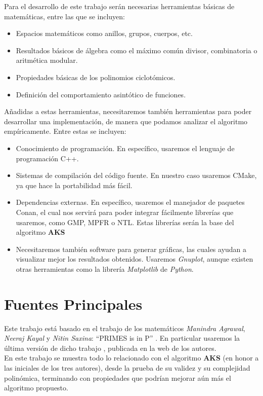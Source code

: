 Para el desarrollo de este trabajo serán necesarias herramientas básicas de matemáticas, entre las que se incluyen:

\begin{itemize}
	\item Espacios matemáticos como anillos, grupos, cuerpos, etc.
	
	\item Resultados básicos de álgebra como el máximo común divisor, combinatoria o aritmética modular.
	
	\item Propiedades básicas de los polinomios ciclotómicos.
	
	\item Definición del comportamiento asintótico de funciones.
\end{itemize}

Añadidas a estas herramientas, necesitaremos también herramientas para poder desarrollar una implementación, de manera que podamos analizar el algoritmo empíricamente. Entre estas se incluyen:

\begin{itemize}
	\item Conocimiento de programación. En específico, usaremos el lenguaje de programación C++.
	
	\item Sistemas de compilación del código fuente. En nuestro caso usaremos CMake, ya que hace la portabilidad más fácil.
	
	\item Dependencias externas. En específico, usaremos el manejador de paquetes Conan, el cual nos servirá para poder integrar fácilmente librerías que usaremos, como GMP, MPFR o NTL. Estas librerías serán la base del algoritmo \textbf{AKS}
	
	\item Necesitaremos también software para generar gráficas, las cuales ayudan a visualizar mejor los resultados obtenidos. Usaremos \textit{Gnuplot}, aunque existen otras herramientas como la librería \textit{Matplotlib} de \textit{Python}.
\end{itemize}

\section{Fuentes Principales}

Este trabajo está basado en el trabajo de los matemáticos \textit{Manindra Agrawal}, \textit{Neeraj Kayal} y \textit{Nitin Saxina}: ``PRIMES is in P'' \cite{AKS2004} \cite{AKS2019}. En particular usaremos la última versión de dicho trabajo \cite{primes_is_in_p}, publicada en la web de los autores.\\

En este trabajo se muestra todo lo relacionado con el algoritmo \textbf{AKS} (en honor a las iniciales de los tres autores), desde la prueba de su validez y su complejidad polinómica, terminando con propiedades que podrían mejorar aún más el algoritmo propuesto.

\endinput
